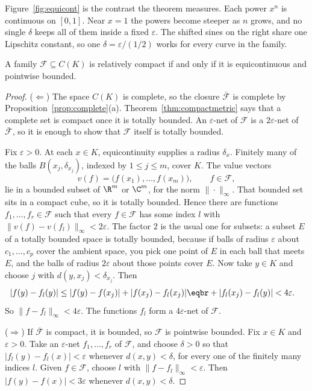 Figure~\ref{fig:equicont} is the contrast the theorem measures. Each power $x^n$ is continuous on $[0,1]$. Near $x=1$ the powers become steeper as $n$ grows, and no single $\delta$ keeps all of them inside a fixed $\varepsilon$. The shifted sines on the right share one Lipschitz constant, so one $\delta=\varepsilon/(1/2)$ works for every curve in the family.

\begin{theorem}\label{thm:ascoli}
A family $\mathcal F\subseteq C(K)$ is relatively compact if and only if it is equicontinuous and pointwise bounded.
\end{theorem}
\begin{proof}
($\Leftarrow$) The space $C(K)$ is complete, so the closure $\bar{\mathcal F}$ is complete by Proposition~\ref{prop:complete}(a). Theorem~\ref{thm:compactmetric} says that a complete set is compact once it is totally bounded. An $\varepsilon$-net of $\mathcal F$ is a $2\varepsilon$-net of $\bar{\mathcal F}$, so it is enough to show that $\mathcal F$ itself is totally bounded.

Fix $\varepsilon>0$. At each $x\in K$, equicontinuity supplies a radius $\delta_x$. Finitely many of the balls $B(x_j,\delta_{x_j})$, indexed by $1\le j\le m$, cover $K$. The value vectors
\[v(f)=\bigl(f(x_1),\dots,f(x_m)\bigr),\qquad f\in\mathcal F,\]
lie in a bounded subset of $\R^m$ or $\C^m$, for the norm $\|\cdot\|_\infty$. That bounded set sits in a compact cube, so it is totally bounded. Hence there are functions $f_1,\dots,f_r\in\mathcal F$ such that every $f\in\mathcal F$ has some index $l$ with $\|v(f)-v(f_l)\|_\infty<2\varepsilon$. The factor $2$ is the usual one for subsets: a subset $E$ of a totally bounded space is totally bounded, because if balls of radius $\varepsilon$ about $c_1,\dots,c_p$ cover the ambient space, you pick one point of $E$ in each ball that meets $E$, and the balls of radius $2\varepsilon$ about those points cover $E$. Now take $y\in K$ and choose $j$ with $d(y,x_j)<\delta_{x_j}$. Then
\[\begin{aligned}|f(y)-f_l(y)|&\le|f(y)-f(x_j)|+|f(x_j)-f_l(x_j)|\eqbr+|f_l(x_j)-f_l(y)|<4\varepsilon.\end{aligned}\]
So $\|f-f_l\|_\infty<4\varepsilon$. The functions $f_l$ form a $4\varepsilon$-net of $\mathcal F$.

($\Rightarrow$) If $\bar{\mathcal F}$ is compact, it is bounded, so $\mathcal F$ is pointwise bounded. Fix $x\in K$ and $\varepsilon>0$. Take an $\varepsilon$-net $f_1,\dots,f_r$ of $\mathcal F$, and choose $\delta>0$ so that $|f_l(y)-f_l(x)|<\varepsilon$ whenever $d(x,y)<\delta$, for every one of the finitely many indices $l$. Given $f\in\mathcal F$, choose $l$ with $\|f-f_l\|_\infty<\varepsilon$. Then $|f(y)-f(x)|<3\varepsilon$ whenever $d(x,y)<\delta$.
\end{proof}

